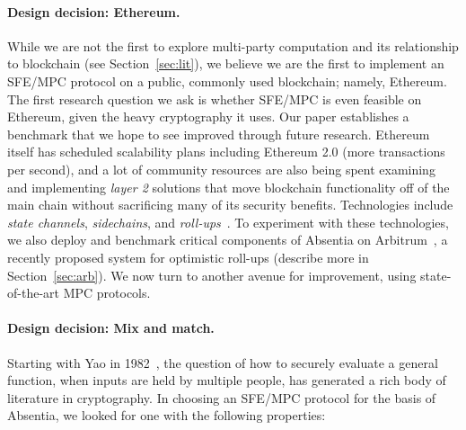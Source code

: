 \paragraph{Design decision: Ethereum.} While we are not the first to explore multi-party computation and its relationship to blockchain (see Section~\ref{sec:lit}), we believe we are the first to implement an SFE/MPC protocol on a public, commonly used blockchain; namely, Ethereum. The first research question we ask is whether SFE/MPC is even feasible on Ethereum, given the heavy cryptography it uses. Our paper establishes a benchmark that we hope to see improved through future research. Ethereum itself has scheduled scalability plans including Ethereum 2.0 (more transactions per second), and a lot of community resources are also being spent examining and implementing \emph{layer 2} solutions that move blockchain functionality off of the main chain without sacrificing many of its security benefits. Technologies include \emph{state channels}, \emph{sidechains}, and \emph{roll-ups}~\cite{GMR+20}. To experiment with these technologies, we also deploy and benchmark critical components of Absentia on Arbitrum~\cite{KGCWF18}, a recently proposed system for optimistic roll-ups (describe more in Section~\ref{sec:arb}). We now turn to another avenue for improvement, using state-of-the-art MPC protocols.

\paragraph{Design decision: Mix and match.} Starting with Yao in 1982~\cite{Yao82}, the question of how to securely evaluate a general function, when inputs are held by multiple people, has generated a rich body of literature in cryptography. In choosing an SFE/MPC protocol for the basis of Absentia, we looked for one with the following properties:

